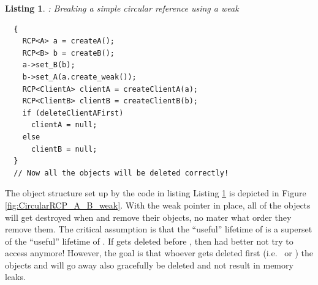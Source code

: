 \documentclass[pdf,ps2pdf,11pt]{SANDreport}
\newtheorem{listing}{Listing}
\begin{document}
\begin{listing}: Breaking a simple circular reference using a weak
{} \\
\label{listing:CircularRCP_A_B_weak}
{\small\begin{verbatim}
  {
    RCP<A> a = createA();
    RCP<B> b = createB();
    a->set_B(b);
    b->set_A(a.create_weak());
    RCP<ClientA> clientA = createClientA(a);
    RCP<ClientB> clientB = createClientB(b);
    if (deleteClientAFirst)
      clientA = null;
    else
      clientB = null;
  }
  // Now all the objects will be deleted correctly!
\end{verbatim}}
\end{listing}


The object structure set up by the code in listing Listing
{}\ref{listing:CircularRCP_A_B_weak} is depicted in Figure
{}\ref{fig:CircularRCP_A_B_weak}.  With the weak pointer in place, all
of the objects will get destroyed when {} and
{} remove their {} objects, no mater what order
they remove them.  The critical assumption is that the ``useful''
lifetime of {} is a superset of the ``useful'' lifetime of
{}.  If {} gets deleted before {}, then {}
had better not try to access {} anymore!  However, the goal is
that whoever gets deleted first (i.e.\ {} or
{}) the objects {} and {} will go away also
gracefully be deleted and not result in memory leaks.
\end{document}
